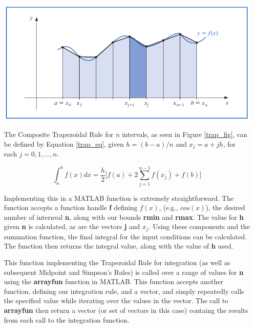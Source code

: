 \documentclass[a4paper]{article}
\begin{document}
\begin{center}
	\includegraphics[width=1\textwidth]{../additional/trapezoidal_fig.png}
	\label{trap_fig}
\end{center}


The Composite Trapezoidal Rule for $n$ intervals, as seen in Figure \ref{trap_fig}, can be defined by Equation \ref{trap_eq}, given $h=(b-a)/n$ and $x_j=a+jh$, for each $j=0,1,\dots,n$\cite{burden2010}.

\begin{equation}
\int_{a}^b f(x) dx = \frac{h}{2} \Bigg[ f(a) + 2 \sum_{j=1}^{n-1} f(x_j) + f(b) \Bigg]
\label{trap_eq}
\end{equation}

Implementing this in a MATLAB function is extremely straightforward. The function accepts a function handle \textbf{f} defining $f(x)$, (e.g., $cos(x)$), the desired number of internval \textbf{n}, along with our bounds \textbf{rmin} and \textbf{rmax}. The value for \textbf{h} given \textbf{n} is calculated, as are the vectors \textbf{j} and \textbf{$x_j$}. Using these components and the summation function, the final integral for the input conditions can be calculated. The function then returns the integral value, along with the value of \textbf{h} used.

This function implementing the Trapezoidal Rule for integration (as well as subsequent Midpoint and Simpson's Rules) is called over a range of values for \textbf{n} using the \textbf{arrayfun} function in MATLAB. This function accepts another function, defining our integration rule, and a vector, and simply repeatedly calls the specified value while iterating over the values in the vector. The call to \textbf{arrayfun} then return a vector (or set of vectors in this case) containg the results from each call to the integration function.
\end{document}
